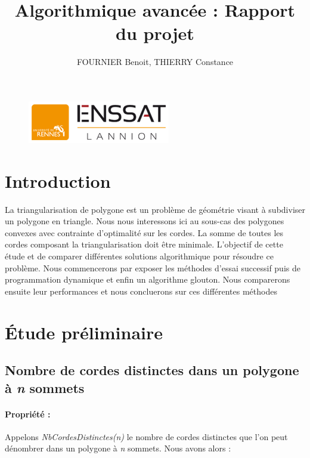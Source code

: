 \documentclass[a4paper,10pt]{article}
\title{Algorithmique avancée : Rapport du projet}
\author{FOURNIER Benoit, THIERRY Constance}
\begin{document}
\maketitle

\begin{figure}[b]
\begin{center}
\includegraphics[scale=1]{Enssat.png}
\end{center}
\end{figure}

\thispagestyle{empty}

\newpage
\null
\thispagestyle{empty}
\newpage

\tableofcontents

\hfill

\listoffigures

\newpage
\null
\thispagestyle{empty}
\newpage

\section{Introduction}

La triangularisation de polygone est un problème de géométrie visant à subdiviser un polygone en triangle.
Nous nous interessons ici au sous-cas des polygones convexes avec contrainte d'optimalité sur les cordes.
La somme de toutes les cordes composant la triangularisation doit être minimale.
L'objectif de cette étude et de comparer différentes solutions algorithmique pour résoudre ce problème.
Nous commencerons par exposer les méthodes d'essai successif puis de programmation dynamique et enfin un algorithme glouton.
Nous comparerons ensuite leur performances et nous concluerons sur ces différentes méthodes


\section{Étude préliminaire}

\subsection{Nombre de cordes distinctes dans un polygone à \emph{n} sommets}

\paragraph{Propriété :}
Appelons \emph{NbCordesDistinctes(n)} le nombre de cordes distinctes que l'on peut dénombrer dans un polygone à \emph{n} sommets.
Nous avons alors :
\end{document}
